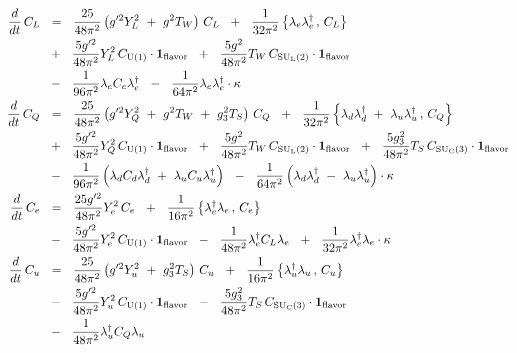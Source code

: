 \documentclass[12pt]{revtex4}
\newcommand{\suc}{{{\rm SU}_{\rm C}(3)}}
\newcommand{\sul}{{{\rm SU}_{\rm L}(2)}}
\newcommand{\ue}{{{\rm U}(1)}}
\newcommand{\uflavor}{\mathbf{1}_{\rm flavor}}
\begin{document}
\begin{align}
\notag
	\frac{d}{dt}\, 
	C_L
	&
	~~=~~
	\frac{25}{48\pi^2}
	\left(
		g'^2 Y_L^2  ~+~
		g^2 T_W 
	\right)\, C_L 
	~~+~~
	\frac{1}{32\pi^2} 
		\left\{ \lambda_e\lambda_e^\dag\,,\, C_L \right\}
	\\
\notag
	&
	~~+~~
	\frac{5 g'^2}{48\pi^2}  Y_L^2\, C_\ue \cdot \uflavor
	~~+~~
	\frac{5 g^2}{48\pi^2} T_W\, C_\sul \cdot \uflavor
	\\
\notag 
	&
	~~-~~
	\frac{1}{96\pi^2} \lambda_e C_e \lambda_e^\dag 
	~~-~~
	\frac{1}{64\pi^2} \lambda_e \lambda_e^\dag \cdot \kappa
	\\
\notag
	\frac{d}{dt}\, 
	C_Q
	&
	~~=~~
	\frac{25}{48\pi^2}
	\left(
		g'^2 Y_Q^2 ~+~
		g^2 T_W ~+~
		g_3^2 T_S
	\right)\,
	C_Q
	~~+~~
	\frac{1}{32\pi^2} 
	\left\{ \lambda_d \lambda_d^\dag ~+~
		\lambda_u \lambda_u^\dag \,,\,
		C_Q 
	\right\}
	\\
\notag
	&
	~~+~~
	\frac{5 g'^2}{48\pi^2} Y_Q^2\, C_\ue \cdot \uflavor 
	~~+~~ 
	\frac{5 g^2}{48\pi^2} T_W\, C_\sul \cdot \uflavor 
	~~+~~
	\frac{5 g_3^2}{48\pi^2} T_S\, C_\suc \cdot \uflavor
	\\
\notag
	&
	~~-~~
	\frac{1}{96\pi^2}
	\left( \lambda_d C_d \lambda_d^\dag ~+~
		\lambda_u C_u \lambda_u^\dag 
	\right)
	~~-~~
	\frac{1}{64\pi^2}
	\left( \lambda_d \lambda_d^\dag ~-~
		\lambda_u \lambda_u^\dag 
	\right) \cdot
	\kappa
	\\
\notag
	\frac{d}{dt}\, 
	C_e
	&
	~~=~~
	\frac{25 g'^2}{48\pi^2} Y_e^2\, C_e
	~~+~~
	\frac{1}{16\pi^2} 
	\left\{ \lambda_e^\dag \lambda_e \,,\,
		C_e 
	\right\}
	\\
\notag
	&
	~~-~~
	\frac{5 g'^2}{48\pi^2} Y_e^2\, C_\ue \cdot \uflavor
	~~-~~
	\frac{1}{48\pi^2} \lambda_e^\dag C_L \lambda_e
	~~+~~
	\frac{1}{32\pi^2} \lambda_e^\dag \lambda_e \cdot
	\kappa
	\\
\notag
	\frac{d}{dt}\, 
	C_u
	&
	~~=~~
	\frac{25}{48\pi^2} 
	\left(
	g'^2 Y_u^2 ~+~ g_3^2 T_S 
	\right)\, C_u
	~~+~~
	\frac{1}{16\pi^2} 
	\left\{ \lambda_u^\dag \lambda_u \,,\, C_u 
	\right\}
	\\
\notag
	&
	~~-~~
	\frac{5 g'^2}{48\pi^2} Y_u^2\, C_\ue \cdot \uflavor
	~~-~~
	\frac{5 g_3^2}{48\pi^2} T_S\, C_\suc \cdot \uflavor 
	\\
\notag
	&
	~~-~~
	\frac{1}{48\pi^2}
	\lambda_u^\dag C_Q \lambda_u 

\end{align}
\end{document}
